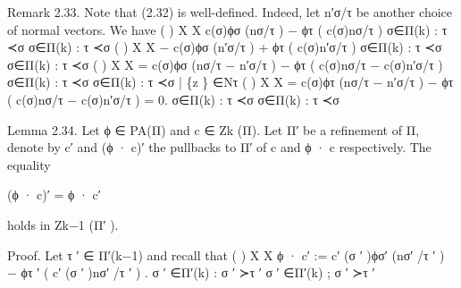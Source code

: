 \documentclass[
  11pt,
]{article}
\newenvironment{Shaded}{}{}
\newcommand{\NormalTok}[1]{#1}
\begin{document}
\begin{Shaded}
\begin{Highlighting}[]
\NormalTok{Remark 2.33. Note that (2.32) is well{-}defined. Indeed, let n′σ/τ be another choice of normal}
\NormalTok{vectors. We have}
\NormalTok{                                  (                )}
\NormalTok{        X                           X}
\NormalTok{              c(σ)ϕσ (nσ/τ ) − ϕτ (       c(σ)nσ/τ )}
\NormalTok{     σ∈Π(k) : τ ≺σ                                    σ∈Π(k) : τ ≺σ}
\NormalTok{                                                                      (                              )}
\NormalTok{                             X                                                X}
\NormalTok{                     −                   c(σ)ϕσ (n′σ/τ ) + ϕτ (                           c(σ)n′σ/τ )}
\NormalTok{                         σ∈Π(k) : τ ≺σ                                    σ∈Π(k) : τ ≺σ}
\NormalTok{                                                                                (                                                    )}
\NormalTok{                             X                                                            X}
\NormalTok{                     =                 c(σ)ϕσ (nσ/τ − n′σ/τ ) − ϕτ (              c(σ)nσ/τ − c(σ)n′σ/τ )}
\NormalTok{                         σ∈Π(k) : τ ≺σ                              σ∈Π(k) : τ ≺σ}
\NormalTok{                                               |    \{z    \}}
\NormalTok{                                                             ∈Nτ}
\NormalTok{                                                                                (                                                    )}
\NormalTok{                             X                                                            X}
\NormalTok{                     =                   c(σ)ϕτ (nσ/τ − n′σ/τ ) − ϕτ (                             c(σ)nσ/τ − c(σ)n′σ/τ ) = 0.}
\NormalTok{                         σ∈Π(k) : τ ≺σ                                             σ∈Π(k) : τ ≺σ}

\NormalTok{Lemma 2.34. Let ϕ ∈ PA(Π) and c ∈ Zk (Π). Let Π′ be a refinement of Π, denote by c′ and (ϕ · c)′}
\NormalTok{the pullbacks to Π′ of c and ϕ · c respectively. The equality}

\NormalTok{                                                               (ϕ · c)′ = ϕ · c′}

\NormalTok{holds in Zk−1 (Π′ ).}


\NormalTok{Proof. Let τ ′ ∈ Π′(k−1) and recall that}
\NormalTok{                                                                                   (                                         )}
\NormalTok{                                    X                                                        X}
\NormalTok{                ϕ · c′ :=                            c′ (σ ′ )ϕσ′ (nσ′ /τ ′ ) − ϕτ ′ (                       c′ (σ ′ )nσ′ /τ ′ ) .}
\NormalTok{                             σ ′ ∈Π′(k) : σ ′ ≻τ ′                                   σ ′ ∈Π′(k) ; σ ′ ≻τ ′}



\end{Highlighting}
\end{Shaded}
\end{document}

